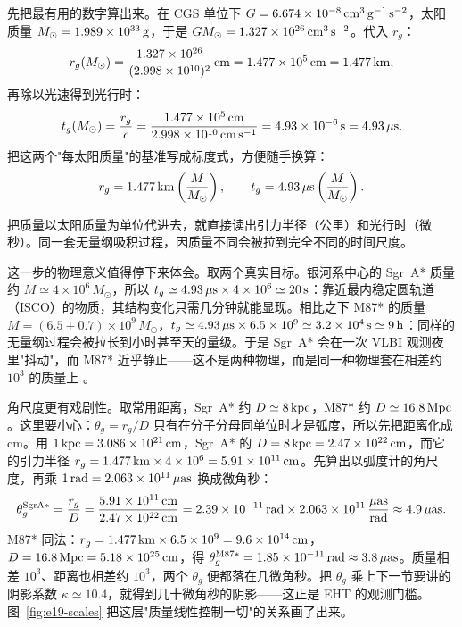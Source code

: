 先把最有用的数字算出来。在 CGS 单位下 \(G=6.674\times10^{-8}\,{\rm cm^3\,g^{-1}\,s^{-2}}\)，太阳质量 \(M_\odot=1.989\times10^{33}\,{\rm g}\)，于是 \(GM_\odot=1.327\times10^{26}\,{\rm cm^3\,s^{-2}}\)。代入 \(r_g\)：
\[
  r_g(M_\odot)=\frac{1.327\times10^{26}}{(2.998\times10^{10})^2}\,{\rm cm}
  =1.477\times10^{5}\,{\rm cm}=1.477\,{\rm km},
\]
再除以光速得到光行时：
\[
  t_g(M_\odot)=\frac{r_g}{c}=\frac{1.477\times10^{5}\,{\rm cm}}{2.998\times10^{10}\,{\rm cm\,s^{-1}}}
  =4.93\times10^{-6}\,{\rm s}=4.93\,\mu{\rm s}.
\]
把这两个"每太阳质量"的基准写成标度式，方便随手换算：
\begin{equation}
  r_g=1.477\,{\rm km}\left(\frac{M}{M_\odot}\right),\qquad
  t_g=4.93\,\mu{\rm s}\left(\frac{M}{M_\odot}\right).
  \label{eq:e19-scalenum}
\end{equation}
\begin{formulaexplain}
把质量以太阳质量为单位代进去，就直接读出引力半径（公里）和光行时（微秒）。同一套无量纲吸积过程，因质量不同会被拉到完全不同的时间尺度。
\end{formulaexplain}

这一步的物理意义值得停下来体会。取两个真实目标。银河系中心的 Sgr~A* 质量约 \(M\simeq4\times10^6\,M_\odot\)，所以 \(t_g\simeq4.93\,\mu{\rm s}\times4\times10^6\simeq20\,{\rm s}\)：靠近最内稳定圆轨道（ISCO）的物质，其结构变化只需几分钟就能显现。相比之下 M87* 的质量 \(M=(6.5\pm0.7)\times10^9\,M_\odot\)，\(t_g\simeq4.93\,\mu{\rm s}\times6.5\times10^9\simeq3.2\times10^4\,{\rm s}\simeq9\,{\rm h}\)：同样的无量纲过程会被拉长到小时甚至天的量级。于是 Sgr~A* 会在一次 VLBI 观测夜里"抖动"，而 M87* 近乎静止——这不是两种物理，而是同一种物理套在相差约 \(10^3\) 的质量上 \citep{2019ApJ...875L...1E,2019ApJ...875L...6E,2022ApJ...930L..12E}。

角尺度更有戏剧性。取常用距离，Sgr~A* 约 \(D\simeq8\,{\rm kpc}\)，M87* 约 \(D\simeq16.8\,{\rm Mpc}\)。这里要小心：\(\theta_g=r_g/D\) 只有在分子分母同单位时才是弧度，所以先把距离化成 cm。用 \(1\,{\rm kpc}=3.086\times10^{21}\,{\rm cm}\)，Sgr~A* 的 \(D=8\,{\rm kpc}=2.47\times10^{22}\,{\rm cm}\)，而它的引力半径 \(r_g=1.477\,{\rm km}\times4\times10^6=5.91\times10^{11}\,{\rm cm}\)。先算出以弧度计的角尺度，再乘 \(1\,{\rm rad}=2.063\times10^{11}\,\mu{\rm as}\) 换成微角秒：
\[
  \theta_g^{\rm SgrA*}=\frac{r_g}{D}
  =\frac{5.91\times10^{11}\,{\rm cm}}{2.47\times10^{22}\,{\rm cm}}
  =2.39\times10^{-11}\,{\rm rad}
  \times 2.063\times10^{11}\,\frac{\mu{\rm as}}{\rm rad}
  \approx 4.9\,\mu{\rm as}.
\]
M87* 同法：\(r_g=1.477\,{\rm km}\times6.5\times10^9=9.6\times10^{14}\,{\rm cm}\)，\(D=16.8\,{\rm Mpc}=5.18\times10^{25}\,{\rm cm}\)，得 \(\theta_g^{\rm M87*}=1.85\times10^{-11}\,{\rm rad}\approx3.8\,\mu{\rm as}\)。质量相差 \(10^3\)、距离也相差约 \(10^3\)，两个 \(\theta_g\) 便都落在几微角秒。把 \(\theta_g\) 乘上下一节要讲的阴影系数 \(\kappa\simeq10.4\)，就得到几十微角秒的阴影——这正是 EHT 的观测门槛。图~\ref{fig:e19-scales} 把这层"质量线性控制一切"的关系画了出来。

